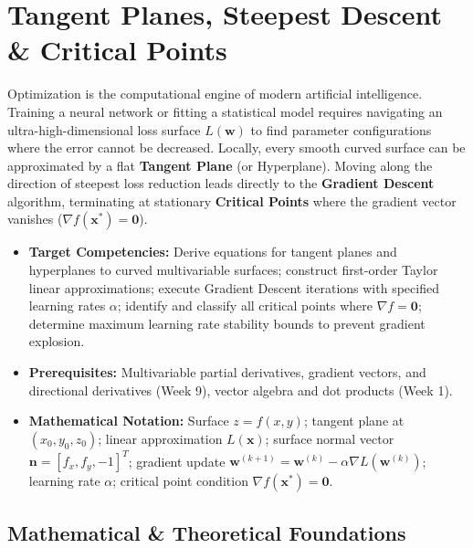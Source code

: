 \chapter{Tangent Planes, Steepest Descent \& Critical Points}

Optimization is the computational engine of modern artificial intelligence. Training a neural network or fitting a statistical model requires navigating an ultra-high-dimensional loss surface $L(\mathbf{w})$ to find parameter configurations where the error cannot be decreased. Locally, every smooth curved surface can be approximated by a flat \textbf{Tangent Plane} (or Hyperplane). Moving along the direction of steepest loss reduction leads directly to the \textbf{Gradient Descent} algorithm, terminating at stationary \textbf{Critical Points} where the gradient vector vanishes ($\nabla f(\mathbf{x}^*) = \mathbf{0}$).

\vspace{0.5cm}
\begin{tcolorbox}[colback=primarylight, colframe=primarydark, title={\textbf{Executive Roadmap \& Learning Objectives}}]
\begin{itemize}
    \item \textbf{Target Competencies:} Derive equations for tangent planes and hyperplanes to curved multivariable surfaces; construct first-order Taylor linear approximations; execute Gradient Descent iterations with specified learning rates $\alpha$; identify and classify all critical points where $\nabla f = \mathbf{0}$; determine maximum learning rate stability bounds to prevent gradient explosion.
    \item \textbf{Prerequisites:} Multivariable partial derivatives, gradient vectors, and directional derivatives (Week 9), vector algebra and dot products (Week 1).
    \item \textbf{Mathematical Notation:} Surface $z = f(x, y)$; tangent plane at $(x_0, y_0, z_0)$; linear approximation $L(\mathbf{x})$; surface normal vector $\mathbf{n} = [f_x, f_y, -1]^T$; gradient update $\mathbf{w}^{(k+1)} = \mathbf{w}^{(k)} - \alpha \nabla L(\mathbf{w}^{(k)})$; learning rate $\alpha$; critical point condition $\nabla f(\mathbf{x}^*) = \mathbf{0}$.
\end{itemize}
\end{tcolorbox}

\section{Mathematical \& Theoretical Foundations}

